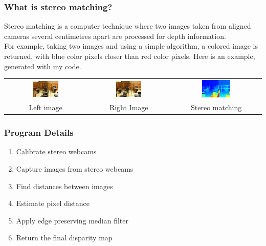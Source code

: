 \documentclass[19pt]{beamer}
\begin{document}
\begin{frame}
\frametitle{What is stereo matching?}

Stereo matching is a computer technique where two images taken from aligned cameras several centimetres apart are processed for depth information. \\[10pt]
%
For example, taking two images and using a simple algorithm, a colored image is returned, with blue color pixels closer than red color pixels. Here is an example, generated with my code.\\[20pt]

\centering
\setlength{}
\begin{tabular}{ccc}
\includegraphics[width=0.33\textwidth]{images/im0-600.jpg} &
\includegraphics[width=0.33\textwidth]{images/im1-600.jpg} &
\includegraphics[width=0.33\textwidth]{images/disp-600.jpg} \\[2pt]
Left image & Right Image & Stereo matching \\
\end{tabular}

\end{frame}


\begin{frame}
\frametitle{Program Details}
\begin{enumerate}
    \item Calibrate stereo webcams\\[10pt]
    \item Capture images from stereo webcams\\[10pt]
    \item Find distances between images\\[10pt]
    \item Estimate pixel distance\\[10pt]
    \item Apply edge preserving median filter\\[10pt]
    \item Return the final disparity map 
\end{enumerate}
\end{frame}
\end{document}
